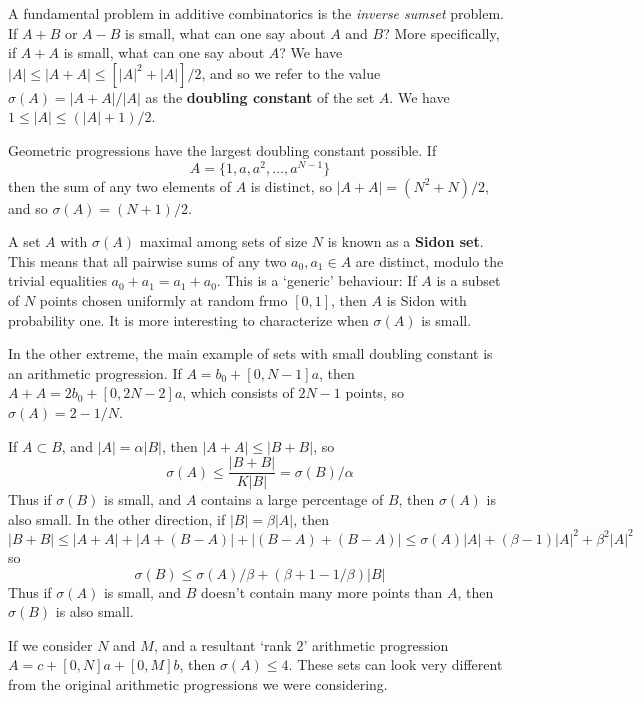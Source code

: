 A fundamental problem in additive combinatorics is the {\it inverse sumset} problem. If $A + B$ or $A - B$ is small, what can one say about $A$ and $B$? More specifically, if $A + A$ is small, what can one say about $A$? We have $|A| \leq |A + A| \leq [|A|^2 + |A|]/2$, and so we refer to the value $\sigma(A) = |A + A|/|A|$ as the {\bf doubling constant} of the set $A$. We have $1 \leq |A| \leq (|A| + 1)/2$.

\begin{example}
    Geometric progressions have the largest doubling constant possible. If
    \[ A = \{ 1, a, a^2, \dots, a^{N-1} \} \]
    then the sum of any two elements of $A$ is distinct, so $|A + A| = (N^2 + N)/2$, and so $\sigma(A) = (N+1)/2$.
\end{example}

A set $A$ with $\sigma(A)$ maximal among sets of size $N$ is known as a {\bf Sidon set}. This means that all pairwise sums of any two $a_0,a_1 \in A$ are distinct, modulo the trivial equalities $a_0 + a_1 = a_1 + a_0$. This is a `generic' behaviour: If $A$ is a subset of $N$ points chosen uniformly at random frmo $[0,1]$, then $A$ is Sidon with probability one. It is more interesting to characterize when $\sigma(A)$ is small.

\begin{example}
    In the other extreme, the main example of sets with small doubling constant is an arithmetic progression. If $A = b_0 + [0,N-1] a$, then $A + A = 2b_0 + [0,2N-2] a$, which consists of $2N-1$ points, so $\sigma(A) = 2 - 1/N$.
\end{example}

\begin{example}
    If $A \subset B$, and $|A| = \alpha |B|$, then $|A + A| \leq |B + B|$, so
    \[ \sigma(A) \leq \frac{|B+B|}{K|B|} = \sigma(B)/\alpha \]
    Thus if $\sigma(B)$ is small, and $A$ contains a large percentage of $B$, then $\sigma(A)$ is also small. In the other direction, if $|B| = \beta |A|$, then
    \[ |B+B| \leq |A + A| + |A + (B - A)| + |(B-A) + (B-A)| \leq \sigma(A)|A| + (\beta - 1)|A|^2 + \beta^2 |A|^2 \]
    so
    \[ \sigma(B) \leq \sigma(A)/\beta + (\beta + 1 - 1/\beta)|B| \]
    Thus if $\sigma(A)$ is small, and $B$ doesn't contain many more points than $A$, then $\sigma(B)$ is also small.
\end{example}

\begin{example}
    If we consider $N$ and $M$, and a resultant `rank 2' arithmetic progression $A = c + [0,N]a + [0,M]b$, then $\sigma(A) \leq 4$. These sets can look very different from the original arithmetic progressions we were considering.
\end{example}

